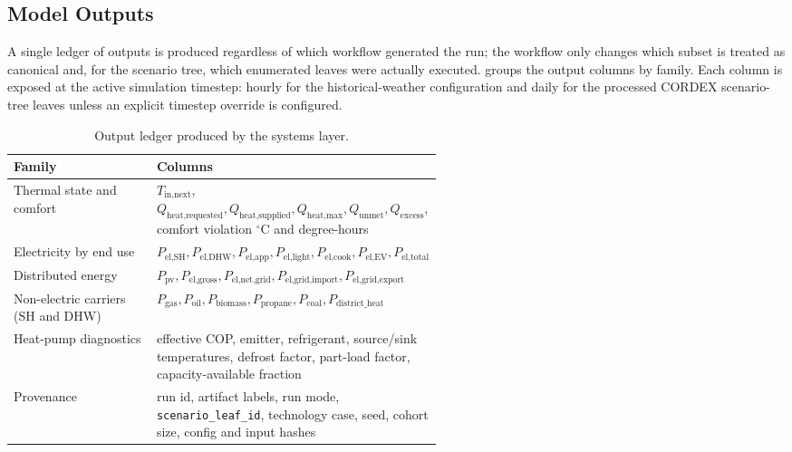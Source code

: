 \subsection{Model Outputs}
\label{sec:modelOutputs}
A single ledger of outputs is produced regardless of which workflow generated the run; the workflow only changes which subset is treated as canonical and, for the scenario tree, which enumerated leaves were actually executed.
 groups the output columns by family. Each column is exposed at the active simulation timestep: hourly for the historical-weather configuration and daily for the processed CORDEX scenario-tree leaves unless an explicit timestep override is configured.

\begin{table}[ht]
  \centering
  \footnotesize
  \caption{Output ledger produced by the systems layer.}
  \label{tab:outputs_inventory}
  \begin{tabular}{@{}l p{0.55\linewidth}@{}}
    \toprule
    \textbf{Family} & \textbf{Columns} \\
    \midrule
    Thermal state and comfort
      & $T_{\text{in,next}}$,
        $Q_{\text{heat,requested}}, Q_{\text{heat,supplied}},
        Q_{\text{heat,max}}, Q_{\text{unmet}}, Q_{\text{excess}}$,
        comfort violation $^{\circ}\text{C}$ and degree-hours \\
    Electricity by end use
      & $P_{\text{el,SH}}, P_{\text{el,DHW}}, P_{\text{el,app}},
         P_{\text{el,light}}, P_{\text{el,cook}}, P_{\text{el,EV}},
         P_{\text{el,total}}$ \\
    Distributed energy
      & $P_{\text{pv}}, P_{\text{el,gross}},
         P_{\text{el,net,grid}}, P_{\text{el,grid,import}},
         P_{\text{el,grid,export}}$ \\
    Non-electric carriers (SH and DHW)
      & $P_{\text{gas}}, P_{\text{oil}}, P_{\text{biomass}},
         P_{\text{propane}}, P_{\text{coal}},
         P_{\text{district\_heat}}$ \\
    Heat-pump diagnostics
      & effective COP, emitter, refrigerant, source/sink
        temperatures, defrost factor, part-load factor,
        capacity-available fraction \\
    Provenance
      & run id, artifact labels, run mode,
        \texttt{scenario\_leaf\_id}, technology case, seed,
        cohort size, config and input hashes
        \cite{Wilkinson2016} \\
    \bottomrule
  \end{tabular}
\end{table}

